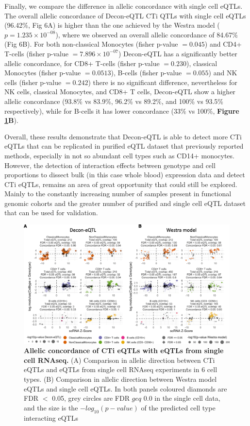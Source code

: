 Finally, we compare the difference in allelic concordance with single cell eQTLs. The overall allelic concordance of Decon-eQTL CTi QTLs with single cell eQTLs (96.42\%, Fig 6A) is higher than the one achieved by the Westra model ($p = 1.235 \times 10^{-08}$), where we observed an overall allelic concordance of 84.67\% (Fig 6B). For both non-classical Monocytes (fisher p-value $= 0.045$) and CD4+ T-cells (fisher p-value $= 7.896 \times 10^{-07}$) Decon-eQTL has a significantly better allelic concordance, for CD8+ T-cells (fisher p-value $= 0.230$), classical Monocytes (fisher p-value $= 0.0513$), B-cells (fisher p-value $= 0.055$) and NK cells (fisher p-value $= 0.242$) there is no significant difference, nevertheless for NK cells, classical Monocytes, and CD8+ T cells, Decon-eQTL show a higher allelic concordance (93.8\% vs 83.9\%, 96.2\% vs 89.2\%, and 100\% vs 93.5\% respectively), while for B-cells it has lower concordance (33\% vs 100\%, \textbf{Figure \ref{decon_fig6}B}).

Overall, these results demonstrate that Decon-eQTL is able to detect more CTi eQTLs that can be replicated in purified eQTL dataset that previously reported methods, especially in not so abundant cell types such as CD14+ monocytes. However, the detection of interaction effects between genotype and cell proportions to dissect bulk (in this case whole blood) expression data and detect CTi eQTLs, remains an area of great opportunity that could still be explored. Mainly to the constantly increasing  number of samples present in functional genomic cohorts and the greater number of purified and single cell eQTL dataset that can be used for validation. 

\begin{figure}[H]
	\includegraphics[width=\textwidth]{chapters/chapter4-deconvolution/img/fig6.png}
	\caption{\textbf{Allelic concordance of CTi eQTLs with eQTLs from single cell RNAseq.} (A) Comparison in allelic direction between CTi eQTLs and eQTLs from single cell RNAseq experiments in 6 cell types. (B) Comparison in allelic direction between Westra model eQTLs and single cell eQTLs. In both panels coloured diamonds are FDR $<$ 0.05, grey circles are FDR $geq$ 0.0 in the single cell data, and the size is the $-log_{10}(p-value)$ of the predicted cell type interacting eQTLs}
	\label{decon_fig6}
\end{figure}

